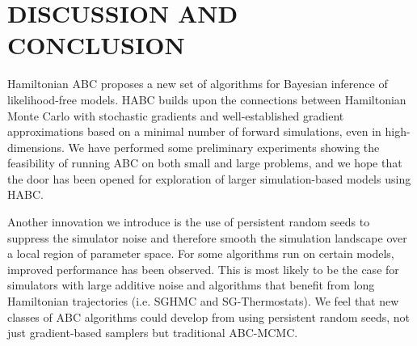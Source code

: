 \documentclass[]{article}
\begin{document}
%







\section{DISCUSSION AND CONCLUSION} \label{sec:conclusion}
\vspace{-0.1in}
Hamiltonian ABC proposes a new set of algorithms for Bayesian inference of likelihood-free models.  HABC builds  upon the connections between Hamiltonian Monte Carlo with stochastic gradients and well-established gradient approximations based on a minimal number of forward simulations, even in high-dimensions.  We have performed some preliminary experiments showing the feasibility of running ABC on both small and large problems, and we hope that the door has been opened for exploration of larger simulation-based models using HABC. 

Another innovation we introduce is the use of persistent random seeds to suppress the simulator noise and therefore smooth the simulation landscape over a local region of parameter space. For some algorithms run on certain models, improved performance has been observed.  This is most likely to be the case for simulators with large additive noise and algorithms that benefit from long Hamiltonian trajectories (i.e. SGHMC and SG-Thermostats).  We feel that new classes of ABC algorithms could develop from using persistent random seeds, not just gradient-based samplers but traditional ABC-MCMC.
 
\end{document}
